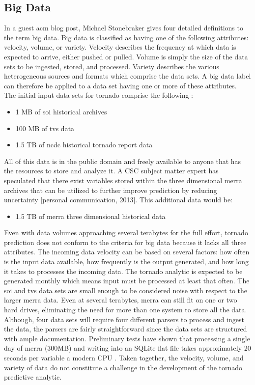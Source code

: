 \subsection{Big Data}
In a guest \gls{acm}  blog post, Michael Stonebraker gives four detailed definitions to the term big data\cite{stonebraker}.  Big data is classified as having one of the following attributes: velocity, volume, or variety.  Velocity describes the frequency at which data is expected to arrive, either pushed or pulled. Volume is simply the size of the data sets to be ingested, stored, and processed. Variety describes the various heterogeneous sources and formats which comprise the data sets. A big data label can therefore be applied to a data set having  one or more of these attributes.\\

The initial input data sets for tornado comprise the following \cite{walker}:
\begin{itemize}
    \item 1 MB of \gls{soi} historical archives \cite{bom}
    \item 100 MB of \gls{tvs} data \cite{hdss}
    \item 1.5 TB of \gls{ncdc} historical tornado report data\cite{ncdc}
\end{itemize}
All of this data is in the public domain and freely available to anyone that has the resources to store and analyze it. A \textsc{CSC} subject matter expert has speculated that there exist variables stored within the three dimensional \gls{merra} archives that can be utilized to further improve prediction by reducing uncertainty [personal communication, 2013]. This additional data would be:
\begin{itemize}
    \item 1.5 TB of \gls{merra} three dimensional historical data \cite{mdisc}
\end{itemize}
Even with data volumes approaching several terabytes for the full effort, tornado prediction does not conform to the criteria for big data because it lacks all three attributes. The incoming data velocity can be based on several factors: how often is the input data available, how frequently is the output generated, and how long it takes to processes the incoming data. The tornado analytic is expected to be generated monthly which means input must be processed at least that often. The \gls{soi} and \gls{tvs} data sets are small enough to be considered noise with respect to the larger \gls{merra} data. Even at several terabytes, \gls{merra} can still fit on one or two hard drives, eliminating the need for more than one system to store all the data.  Although, four data sets will require four different parsers to process and ingest the data, the parsers are fairly straightforward since the data sets are structured with ample documentation. Preliminary tests have shown that processing a single day of \gls{merra} (300MB) and writing into an SQLite flat file takes approximately 20 seconds per variable a modern CPU \cite{keller1}. Taken together, the velocity, volume, and variety of data do not constitute a challenge in the development of the tornado predictive analytic.\\

